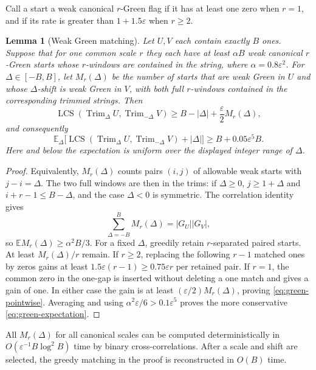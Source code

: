 \documentclass[11pt]{article}
\newtheorem{lemma}[lemma]{Lemma}
\theoremstyle{remark}
\newcommand{\LCS}{\operatorname{LCS}}
\newcommand{\Trim}{\operatorname{Trim}}
\newcommand{\eps}{\varepsilon}
\begin{document}
Call a start a weak canonical $r$-Green flag if it has at least one zero when
$r=1$, and if its rate is greater than $1+1.5\eps$ when $r\ge2$.

\begin{lemma}[Weak Green matching]\label{lem:green}
Let $U,V$ each contain exactly $B$ ones.  Suppose that for one common scale
$r$ they each have at least
$\alpha B$ weak canonical $r$-Green starts whose $r$-windows are contained
in the string, where $\alpha=0.8\eps^2$.  For
$\Delta\in[-B,B]$, let $M_r(\Delta)$ be the number of starts that are weak
Green in $U$ and whose $\Delta$-shift is weak Green in $V$, with both full
$r$-windows contained in the corresponding trimmed strings.  Then
\begin{equation}\label{eq:green-pointwise}
 \LCS(\Trim_\Delta U,\Trim_{-\Delta}V)
 \ge B-|\Delta|+\frac\eps2M_r(\Delta),
\end{equation}
and consequently
\begin{equation}\label{eq:green-expectation}
 \mathbb E_\Delta\bigl[
  \LCS(\Trim_\Delta U,\Trim_{-\Delta}V)+|\Delta|
 \bigr]
 \ge B+0.05\eps^5B.
\end{equation}
Here and below the expectation is uniform over the displayed integer range
of $\Delta$.
\end{lemma}

\begin{proof}
Equivalently, $M_r(\Delta)$ counts pairs $(i,j)$ of allowable weak starts
with $j-i=\Delta$.  The two full windows are then in the trims: if
$\Delta\ge0$, $j\ge1+\Delta$ and $i+r-1\le B-\Delta$, and the case
$\Delta<0$ is symmetric.  The correlation identity gives
\[
 \sum_{\Delta=-B}^{B}M_r(\Delta)=|G_U||G_V|,
\]
so $\mathbb E M_r(\Delta)\ge\alpha^2B/3$.  For a fixed $\Delta$, greedily
retain $r$-separated paired starts.  At least $M_r(\Delta)/r$ remain.  If
$r\ge2$, replacing the following $r-1$ matched ones by zeros gains at least
$1.5\eps(r-1)\ge0.75\eps r$ per retained pair.  If $r=1$, the common zero in
the one-gap is inserted without deleting a one match and gives a gain of one.
In either case the gain is at least $(\eps/2)M_r(\Delta)$, proving
\eqref{eq:green-pointwise}.  Averaging and using
$\alpha^2\eps/6>0.1\eps^5$ proves the more conservative
\eqref{eq:green-expectation}.
\end{proof}

All $M_r(\Delta)$ for all canonical scales can be computed deterministically
in $O(\eps^{-1}B\log^2B)$ time by binary cross-correlations.  After a scale
and shift are selected, the greedy matching in the proof is reconstructed in
$O(B)$ time.
\end{document}
